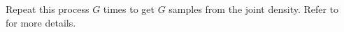 \documentclass{article}
\begin{document}
\vspace{0.2in}
Repeat this process $G$ times to get $G$ samples from the joint density.  Refer to~\cite{1992_JNL_MCMC_Carlin} for more details.

\vspace{0.5in}
%
%
%




\end{document}
